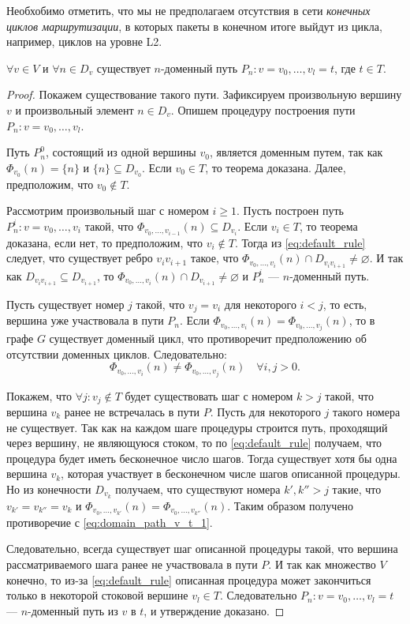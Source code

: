 \documentclass[../thesis.tex]{subfiles}
\begin{document}
Необхобимо отметить, что мы не предполагаем отсутствия в сети \textit{конечных циклов маршрутизации}, в которых пакеты в конечном итоге выйдут из цикла, например, циклов на уровне L2.

\begin{proposition} \label{th:domain_path_v_t}
$\forall v\in V$ и $\forall n\in D_v$ существует $n$-доменный путь $P_n:v=v_0,\dots,v_l=t$, где $t\in T$.
\end{proposition}

\begin{proof}
Покажем существование такого пути.
Зафиксируем произвольную вершину $v$ и произвольный элемент $n\in D_v$.
Опишем процедуру построения пути $P_n:v=v_0,\dots,v_l$.

Путь $P_n^0$, состоящий из одной вершины $v_0$, является доменным путем, так как $\Phi_{v_0}(n) = \{n\}$ и $\{n\}\subseteq D_{v_0}$.
Если $v_0\in T$, то теорема доказана.
Далее, предположим, что $v_0\notin T$.

Рассмотрим произвольный шаг с номером $i\geqslant 1$.
Пусть построен путь $P_n^i:v=v_0,\dots,v_i$ такой, что $\Phi_{v_0,\dots,v_{i-1}}(n)\subseteq D_{v_i}$.
Если $v_i\in T$, то теорема доказана, если нет, то предположим, что $v_i\notin T$.
Тогда из \eqref{eq:default_rule} следует, что существует ребро $v_iv_{i+1}$ такое, что $\Phi_{v_0,\dots,v_i}(n)\cap D_{v_iv_{i+1}}\neq \varnothing$.
И так как $D_{v_iv_{i+1}}\subseteq D_{v_{i+1}}$, то $\Phi_{v_0,\dots,v_i}(n)\cap D_{v_{i+1}}\neq \varnothing$ и $P_n^i$ --- $n$-доменный путь.

Пусть существует номер $j$ такой, что $v_j = v_i$ для некоторого $i<j$, то есть, вершина уже участвовала в пути $P_n$.
Если $\Phi_{v_0,\dots,v_i}(n) = \Phi_{v_0,\dots,v_j}(n)$, то в графе $G$ существует доменный цикл, что противоречит предположению об отсутствии доменных циклов.
Следовательно:
\begin{equation} \label{eq:domain_path_v_t_1}
    \Phi_{v_0,\dots,v_i}(n)\neq \Phi_{v_0,\dots,v_j}(n)\quad \forall i,j>0.
\end{equation}

Покажем, что $\forall j: v_j\notin T$ будет существовать шаг с номером $k>j$ такой, что вершина $v_k$ ранее не встречалась в пути $P$.
Пусть для некоторого $j$ такого номера не существует.
Так как на каждом шаге процедуры строится путь, проходящий через вершину, не являющуюся стоком, то по \eqref{eq:default_rule} получаем, что процедура будет иметь бесконечное число шагов.
Тогда существует хотя бы одна вершина $v_k$, которая участвует в бесконечном числе шагов описанной процедуры.
Но из конечности $D_{v_k}$ получаем, что существуют номера $k',k''>j$ такие, что $v_{k'} = v_{k''} = v_k$ и $\Phi_{v_0,\dots,v_{k'}}(n) = \Phi_{v_0,\dots,v_{k''}}(n)$.
Таким образом получено противоречие с \eqref{eq:domain_path_v_t_1}.

Следовательно, всегда существует шаг описанной процедуры такой, что вершина рассматриваемого шага ранее не участвовала в пути $P$.
И так как множество $V$ конечно, то из-за \eqref{eq:default_rule} описанная процедура может закончиться только в некоторой стоковой вершине $v_l\in T$.
Следовательно $P_n:v=v_0,\dots,v_l=t$ --- $n$-доменный путь из $v$ в $t$, и утверждение доказано.
\end{proof}
\end{document}
